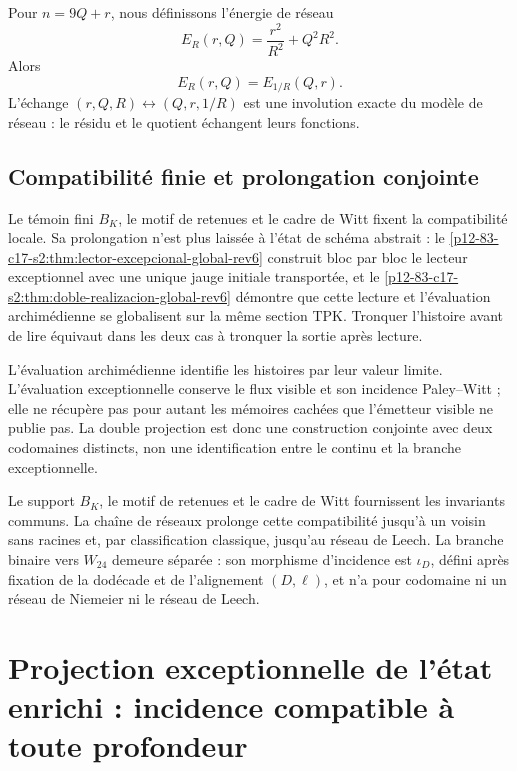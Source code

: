 Pour \(n=9Q+r\), nous définissons l'énergie de réseau
\[
E_R(r,Q)=\frac{r^2}{R^2}+Q^2R^2.
\]
Alors
\[
\boxed{E_R(r,Q)=E_{1/R}(Q,r).}
\]
L'échange \((r,Q,R)\leftrightarrow(Q,r,1/R)\) est une involution exacte
du modèle de réseau : le résidu et le quotient échangent leurs fonctions.

\subsection{Compatibilité finie et prolongation conjointe}

Le témoin fini \(B_K\), le motif de retenues et le cadre de Witt fixent la
compatibilité locale. Sa prolongation n'est plus laissée à l'état de schéma
abstrait : le \cref{p12-83-c17-s2:thm:lector-excepcional-global-rev6} construit bloc par
bloc le lecteur exceptionnel avec une unique jauge initiale transportée, et le
\cref{p12-83-c17-s2:thm:doble-realizacion-global-rev6} démontre que cette lecture et
l'évaluation archimédienne se globalisent sur la même section TPK. Tronquer
l'histoire avant de lire équivaut dans les deux cas à tronquer la sortie après
lecture.

L'évaluation archimédienne identifie les histoires par leur valeur limite.
L'évaluation exceptionnelle conserve le flux visible et son incidence
Paley--Witt ; elle ne récupère pas pour autant les mémoires cachées que l'émetteur visible
ne publie pas. La double projection est donc une construction conjointe avec
deux codomaines distincts, non une identification entre le continu et la branche
exceptionnelle.

\begin{remark}
Le support \(B_K\), le motif de retenues et le cadre de Witt fournissent les
invariants communs. La chaîne de réseaux prolonge cette compatibilité jusqu'à un
voisin sans racines et, par classification classique, jusqu'au réseau de Leech. La
branche binaire vers \(W_{24}\) demeure séparée : son morphisme d'incidence est
\(\iota_D\), défini après fixation de la dodécade et de l'alignement
\((D,\ell)\), et n'a pour codomaine ni un réseau de Niemeier ni le réseau
de Leech.
\end{remark}


\section{Projection exceptionnelle de l'état enrichi : incidence compatible à toute profondeur}
\label{p12-83-c17-s2:chap:lector-excepcional-global-rev6}

